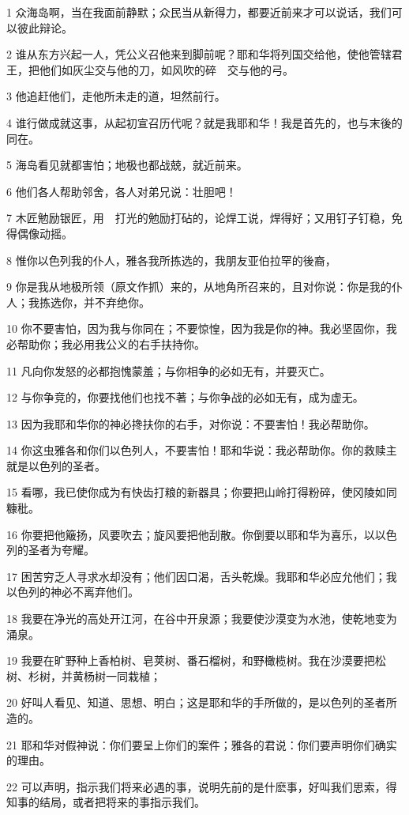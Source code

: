 \par 1 众海岛啊，当在我面前静默；众民当从新得力，都要近前来才可以说话，我们可以彼此辩论。
\par 2 谁从东方兴起一人，凭公义召他来到脚前呢？耶和华将列国交给他，使他管辖君王，把他们如灰尘交与他的刀，如风吹的碎　交与他的弓。
\par 3 他追赶他们，走他所未走的道，坦然前行。
\par 4 谁行做成就这事，从起初宣召历代呢？就是我耶和华！我是首先的，也与末後的同在。
\par 5 海岛看见就都害怕；地极也都战兢，就近前来。
\par 6 他们各人帮助邻舍，各人对弟兄说：壮胆吧！
\par 7 木匠勉励银匠，用　打光的勉励打砧的，论焊工说，焊得好；又用钉子钉稳，免得偶像动摇。
\par 8 惟你以色列我的仆人，雅各我所拣选的，我朋友亚伯拉罕的後裔，
\par 9 你是我从地极所领（原文作抓）来的，从地角所召来的，且对你说：你是我的仆人；我拣选你，并不弃绝你。
\par 10 你不要害怕，因为我与你同在；不要惊惶，因为我是你的神。我必坚固你，我必帮助你；我必用我公义的右手扶持你。
\par 11 凡向你发怒的必都抱愧蒙羞；与你相争的必如无有，并要灭亡。
\par 12 与你争竞的，你要找他们也找不著；与你争战的必如无有，成为虚无。
\par 13 因为我耶和华你的神必搀扶你的右手，对你说：不要害怕！我必帮助你。
\par 14 你这虫雅各和你们以色列人，不要害怕！耶和华说：我必帮助你。你的救赎主就是以色列的圣者。
\par 15 看哪，我已使你成为有快齿打粮的新器具；你要把山岭打得粉碎，使冈陵如同糠秕。
\par 16 你要把他簸扬，风要吹去；旋风要把他刮散。你倒要以耶和华为喜乐，以以色列的圣者为夸耀。
\par 17 困苦穷乏人寻求水却没有；他们因口渴，舌头乾燥。我耶和华必应允他们；我以色列的神必不离弃他们。
\par 18 我要在净光的高处开江河，在谷中开泉源；我要使沙漠变为水池，使乾地变为涌泉。
\par 19 我要在旷野种上香柏树、皂荚树、番石榴树，和野橄榄树。我在沙漠要把松树、杉树，并黄杨树一同栽植；
\par 20 好叫人看见、知道、思想、明白；这是耶和华的手所做的，是以色列的圣者所造的。
\par 21 耶和华对假神说：你们要呈上你们的案件；雅各的君说：你们要声明你们确实的理由。
\par 22 可以声明，指示我们将来必遇的事，说明先前的是什麽事，好叫我们思索，得知事的结局，或者把将来的事指示我们。
